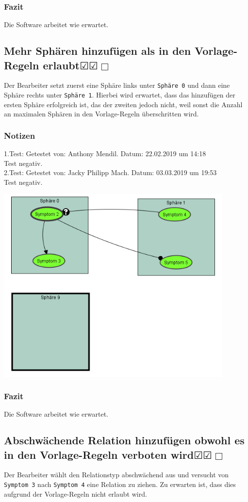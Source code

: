 \documentclass[enabledeprecatedfontcommands]{scrartcl}
\newcommand{\subsectiont}[2]{\subsection[#1]{#1{\normalsize\normalfont #2}}}
\newcommand{\leer}{$\Box$}
\newcommand{\ok}{$\CheckedBox$}
\begin{document}
\subsubsection{Fazit}
Die Software arbeitet wie erwartet.

\subsectiont{Mehr Sphären hinzufügen als in den Vorlage-Regeln erlaubt}{\dotfill\ok\ok\leer}
Der Bearbeiter setzt zuerst eine Sphäre links unter \texttt{Sphäre 0} und dann eine Sphäre rechts unter \texttt{Sphäre 1}. Hierbei wird erwartet, dass das hinzufügen der ersten Sphäre erfolgreich ist, das der zweiten jedoch nicht, weil sonst die Anzahl an maximalen Sphären in den Vorlage-Regeln überschritten wird. 
\subsubsection{Notizen}
1.Test: Getestet von: Anthony Mendil. Datum: 22.02.2019 um 14:18 \\
Test negativ.\\
2.Test: Getestet von: Jacky Philipp Mach. Datum: 03.03.2019 um 19:53 \\
Test negativ.
\begin{center}
\includegraphics[height=10cm]{2_4.PNG}
\end{center}
\subsubsection{Fazit}
Die Software arbeitet wie erwartet.

\subsectiont{Abschwächende Relation hinzufügen obwohl es in den Vorlage-Regeln verboten wird}{\dotfill\ok\ok\leer}
Der Bearbeiter wählt den Relationstyp abschwächend aus und versucht von \texttt{Symptom 3} nach \texttt{Symptom 4} eine Relation zu ziehen. Zu erwarten ist, dass dies aufgrund der Vorlage-Regeln nicht erlaubt wird. 
\end{document}
